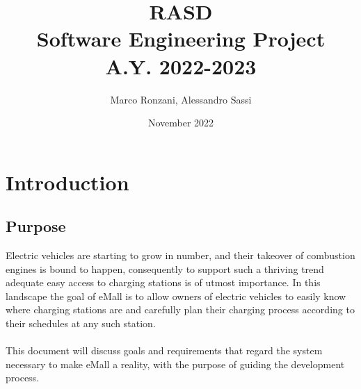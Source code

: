 \documentclass[11pt]{article}
\title{%
  \textbf{RASD} \\
  \large Software Engineering Project \\ A.Y. 2022-2023}
\author{Marco Ronzani, Alessandro Sassi}
\date{November 2022}
\begin{document}
\maketitle

\doublespacing
\tableofcontents
\singlespacing

\section{Introduction}

\subsection{Purpose}

Electric vehicles are starting to grow in number, and their takeover of combustion engines is bound to happen, consequently to support such a thriving trend adequate easy access to charging stations is of utmost importance. In this landscape the goal of eMall is to allow owners of electric vehicles to easily know where charging stations are and carefully plan their charging process according to their schedules at any such station.\\
\\
This document will discuss goals and requirements that regard the system necessary to make eMall a reality, with the purpose of guiding the development process.






\end{document}
